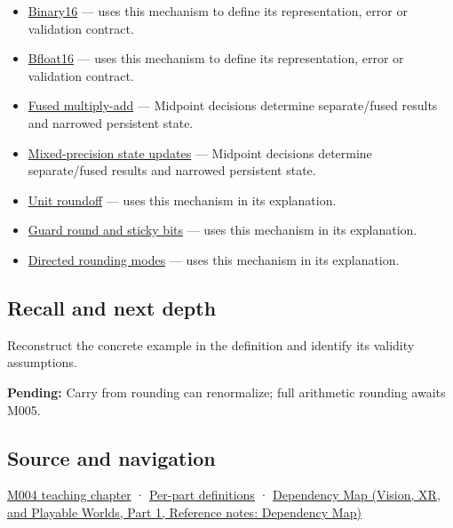 \begin{itemize}
\item
  \hyperref[appendix-34443cec7170]{Binary16} --- uses this mechanism to define its representation, error or validation contract.
\item
  \hyperref[appendix-18b8dd966b5d]{Bfloat16} --- uses this mechanism to define its representation, error or validation contract.
\item
  \hyperref[appendix-41e8ef22a21e]{Fused multiply-add} --- Midpoint decisions determine separate/fused results and narrowed persistent state.
\item
  \hyperref[appendix-260182e617b7]{Mixed-precision state updates} --- Midpoint decisions determine separate/fused results and narrowed persistent state.
\item
  \hyperref[appendix-bc44f7b42f42]{Unit roundoff} --- uses this mechanism in its explanation.
\item
  \hyperref[appendix-b572b631069b]{Guard round and sticky bits} --- uses this mechanism in its explanation.
\item
  \hyperref[appendix-637d164ae5ca]{Directed rounding modes} --- uses this mechanism in its explanation.
\end{itemize}

\subsection{Recall and next depth}\label{appendix-614afe1de592-recall-and-next-depth}

\hypertarget{appendix-614afe1de592-recall-and-next-depth}{}

Reconstruct the concrete example in the definition and identify its validity assumptions.

\textbf{Pending:} Carry from rounding can renormalize; full arithmetic rounding awaits M005.

\subsection{Source and navigation}\label{appendix-614afe1de592-source-and-navigation}

\hypertarget{appendix-614afe1de592-source-and-navigation}{}

\hyperref[01-foundations-i-ch001-a-stretching-ruler-for-real-valued-quantities]{M004 teaching chapter} · \hyperref[appendix-fd090d982a15-m004---parts-61-76]{Per-part definitions} · \href{../07-Vision-XR-and-Playable-Worlds-P01/main.pdf\#nameddest=appendix-4ad47bdd269a}{Dependency Map (Vision, XR, and Playable Worlds, Part 1, Reference notes: Dependency Map)}
